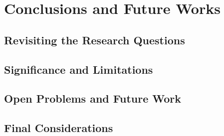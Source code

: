 \chapter[Conclusions and Future Works]{Conclusions and Future Works}\label{Conclusions}

\section{Revisiting the Research Questions}

\section{Significance and Limitations}

\section{Open Problems and Future Work}

\section{Final Considerations}
